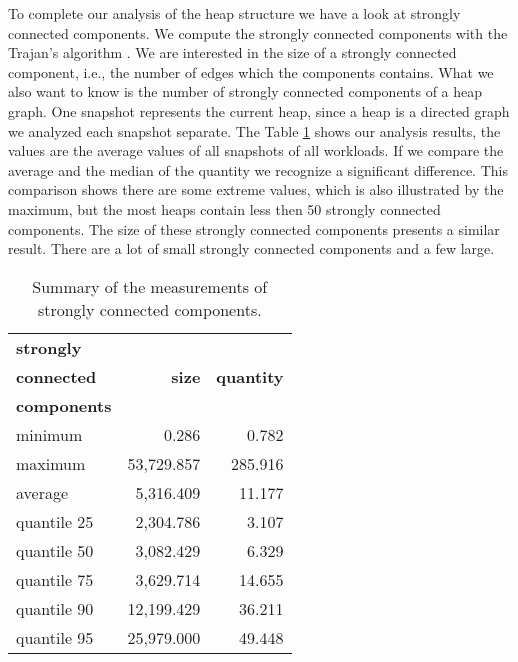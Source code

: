 To complete our analysis of the heap structure we have a look at strongly connected components. We compute the strongly connected components with the Trajan's algorithm \cite{Trajan}. We are interested in the size of a strongly connected component, i.e., the number of edges which the components contains. What we also want to know is the number of strongly connected components of a heap graph. One snapshot represents the current heap, since a heap is a directed graph we analyzed each snapshot separate. The Table \ref{tab:scc_stats} shows our analysis results, the values are the average values of all snapshots of all workloads. If we compare the average and the median of the quantity we recognize a significant difference. This comparison shows there are some extreme values, which is also illustrated by the maximum, but the most heaps contain less then 50 strongly connected components. The size of these strongly connected components presents a similar result. There are a lot of small strongly connected components and a few large.
\begin{table}
	\small
	\centering
	\begin{tabular}{p{2.5cm} r r}
		\toprule
		\textbf{strongly} 	& & \\
		\textbf{connected} 	& \textbf{size} & \textbf{quantity} \\ 
		\textbf{components} & & \\ \midrule
		minimum							&	0.286		&	0.782			\\ 
		maximum							&	53,729.857	&	285.916			\\ 
		average							&	5,316.409	&	11.177			\\ 
		quantile 25						&	2,304.786	&	3.107			\\ 
		quantile 50						&	3,082.429	&	6.329			\\ 
		quantile 75						&	3,629.714	&	14.655			\\ 
		quantile 90						&	12,199.429	&	36.211			\\ 
		quantile 95						&	25,979.000	&	49.448			\\ \bottomrule
	\end{tabular}
	\caption{Summary of the measurements of strongly connected components.}
	\label{tab:scc_stats}
\end{table}